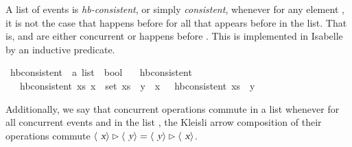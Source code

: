 \documentclass[acmlarge,review,anonymous]{acmart}\settopmatter{printfolios=true}
\begin{document}
A list of events  is \emph{hb-consistent}, or simply \emph{consistent},
whenever for any element , it is not the case that  happens
before  for all  that appears before  in the list. That
is,  and  are either concurrent or  happens before
.  This is implemented in Isabelle by an inductive predicate.

\begin{isabellebody}
  \isanewline
{}\isamarkupfalse%
\ hb{\isacharunderscore}consistent\ {\isacharcolon}{\isacharcolon}\ {\isachardoublequoteopen}{\isacharprime}a\ list\ {\isasymRightarrow}\ bool{\isachardoublequoteclose}\ \isanewline
\ \ {\isachardoublequoteopen}hb{\isacharunderscore}consistent\ {\isacharbrackleft}{\isacharbrackright}{\isachardoublequoteclose}\ {\isacharbar}\isanewline
\ \ {\isachardoublequoteopen}{\isasymlbrakk}\ hb{\isacharunderscore}consistent\ xs{\isacharsemicolon}\ {\isasymforall}x\ {\isasymin}\ set\ xs{\isachardot}\ {\isasymnot}\ y\ {\isasymprec}\ x\ {\isasymrbrakk}\ {\isasymLongrightarrow}\ hb{\isacharunderscore}consistent\ {\isacharparenleft}xs\ {\isacharat}\ {\isacharbrackleft}y{\isacharbrackright}{\isacharparenright}{\isachardoublequoteclose}\isanewline
\end{isabellebody}

Additionally, we say that concurrent operations commute in a list 
whenever for all concurrent events  and  in the list ,
the Kleisli arrow composition of their operations commute $\langle \isa{x}
\rangle \rhd \langle \isa{y} \rangle = \langle \isa{y} \rangle \rhd \langle
\isa{x} \rangle$.
\end{document}
